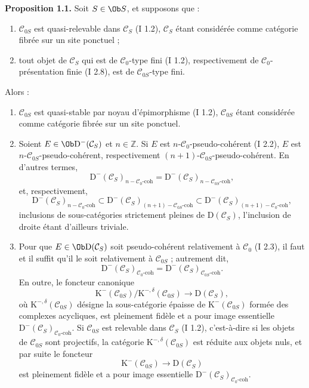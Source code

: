 \documentclass[11pt]{article}
\begin{document}
\textbf{Proposition 1.1.} Soit $S\in\Ob S$, et supposons que :
\begin{enumerate}[label=(\roman*)]
\item $\mathcal C_{0S}$ est quasi-relevable dans $\mathcal C_S$ (I 1.2), $\mathcal C_S$ étant considérée comme catégorie fibrée sur un site ponctuel ;
\item tout objet de $\mathcal C_S$ qui est de $\mathcal C_0$-type fini (I 1.2), respectivement de $\mathcal C_0$-présentation finie (I 2.8), est de $\mathcal C_{0S}$-type fini.
\end{enumerate}
Alors :
\begin{enumerate}[label=\alph*)]
\item $\mathcal C_{0S}$ est quasi-stable par noyau d'épimorphisme (I 1.2), $\mathcal C_{0S}$ étant considérée comme catégorie fibrée sur un site ponctuel.
\item Soient $E\in\Ob \mathrm D^{-}(\mathcal C_S)$ et $n\in\mathbb Z$. Si $E$ est $n$-$\mathcal C_0$-pseudo-cohérent (I 2.2), $E$ est $n$-$\mathcal C_{0S}$-pseudo-cohérent, respectivement $(n+1)$-$\mathcal C_{0S}$-pseudo-cohérent. En d'autres termes,
\[
\mathrm D^{-}(\mathcal C_S)_{n-\mathcal C_0\text{-coh}}
=
\mathrm D^{-}(\mathcal C_S)_{n-\mathcal C_{0S}\text{-coh}},
\]
et, respectivement,
\[
\mathrm D^{-}(\mathcal C_S)_{n-\mathcal C_0\text{-coh}}
\subset
\mathrm D^{-}(\mathcal C_S)_{(n+1)-\mathcal C_{0S}\text{-coh}}
\subset
\mathrm D^{-}(\mathcal C_S)_{(n+1)-\mathcal C_0\text{-coh}},
\]
inclusions de sous-catégories strictement pleines de $\mathrm D(\mathcal C_S)$, l'inclusion de droite étant d'ailleurs triviale.
\item Pour que $E\in\Ob\mathrm D(\mathcal C_S)$ soit pseudo-cohérent relativement à $\mathcal C_0$ (I 2.3), il faut et il suffit qu'il le soit relativement à $\mathcal C_{0S}$ ; autrement dit,
\[
\mathrm D^{-}(\mathcal C_S)_{\mathcal C_0\text{-coh}}
=
\mathrm D^{-}(\mathcal C_S)_{\mathcal C_{0S}\text{-coh}}.
\]
En outre, le foncteur canonique
\[
\mathrm K^{-}(\mathcal C_{0S})/\mathrm K^{-,\delta}(\mathcal C_{0S})
\longrightarrow \mathrm D(\mathcal C_S),
\]
où $\mathrm K^{-,\delta}(\mathcal C_{0S})$ désigne la sous-catégorie épaisse de $\mathrm K^{-}(\mathcal C_{0S})$ formée des complexes acycliques, est pleinement fidèle et a pour image essentielle $\mathrm D^{-}(\mathcal C_S)_{\mathcal C_0\text{-coh}}$. Si $\mathcal C_{0S}$ est relevable dans $\mathcal C_S$ (I 1.2), c'est-à-dire si les objets de $\mathcal C_{0S}$ sont projectifs, la catégorie $\mathrm K^{-,\delta}(\mathcal C_{0S})$ est réduite aux objets nuls, et par suite le foncteur
\[
\mathrm K^{-}(\mathcal C_{0S})\longrightarrow \mathrm D(\mathcal C_S)
\]
est pleinement fidèle et a pour image essentielle $\mathrm D^{-}(\mathcal C_S)_{\mathcal C_0\text{-coh}}$.
\end{enumerate}
\end{document}
